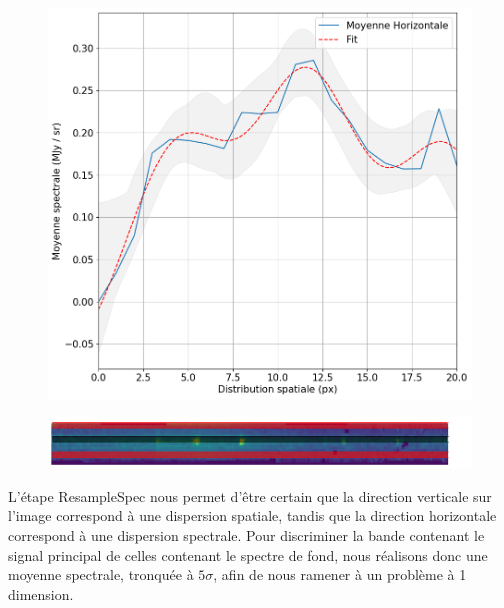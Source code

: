 \documentclass[11pt, a4paper]{article}
\begin{document}
\begin{figure}
  \begin{minipage}{\linewidth}
    \centering\captionsetup[subfigure]{justification=centering}
    \includegraphics[width=0.9\linewidth]{assets/fit_gaussian.png}
    \label{fig:profil_gauss}
    \par
    \vfill
    \includegraphics[width=\linewidth]{assets/extraction.png}
    \label{fig:extraction}
  \end{minipage}
\end{figure}

L'étape ResampleSpec nous permet d'être certain que la direction verticale sur l'image correspond à une dispersion spatiale, tandis que la direction horizontale correspond à une dispersion spectrale. Pour discriminer la bande contenant le signal principal de celles contenant le spectre de fond, nous réalisons donc une moyenne spectrale, tronquée à $5\sigma$, afin de nous ramener à un problème à 1 dimension.\\
\end{document}
